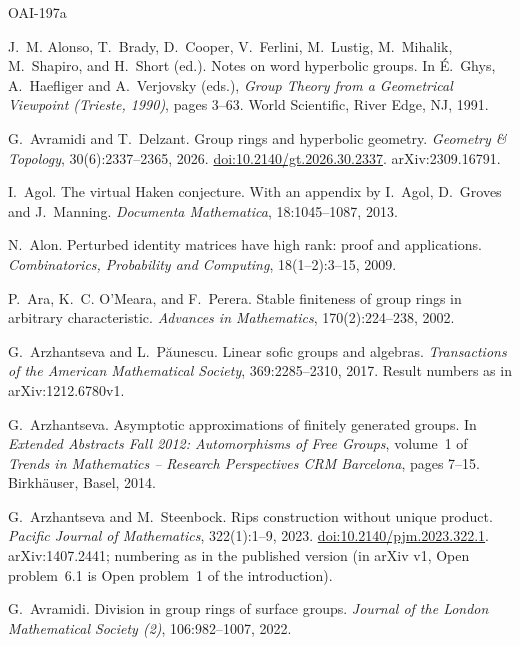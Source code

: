 \documentclass[11pt]{article}
\theoremstyle{definition}
\theoremstyle{plain}
\newcommand{\doi}[1]{\href{https://doi.org/#1}{doi:#1}}
\begin{document}
\begin{thebibliography}{OAI-197a}\footnotesize\setlength{\itemsep}{1pt plus 1pt}

J.~M. Alonso, T.~Brady, D.~Cooper, V.~Ferlini, M.~Lustig, M.~Mihalik, M.~Shapiro, and H.~Short (ed.).
\newblock Notes on word hyperbolic groups.
\newblock In \'E.~Ghys, A.~Haefliger and A.~Verjovsky (eds.), \emph{Group Theory from a Geometrical Viewpoint (Trieste, 1990)}, pages 3--63. World Scientific, River Edge, NJ, 1991.

G.~Avramidi and T.~Delzant.
\newblock Group rings and hyperbolic geometry.
\newblock \emph{Geometry \& Topology}, 30(6):2337--2365, 2026. \doi{10.2140/gt.2026.30.2337}. arXiv:2309.16791.

I.~Agol.
\newblock The virtual Haken conjecture. With an appendix by I.~Agol, D.~Groves and J.~Manning.
\newblock \emph{Documenta Mathematica}, 18:1045--1087, 2013.

N.~Alon.
\newblock Perturbed identity matrices have high rank: proof and applications.
\newblock \emph{Combinatorics, Probability and Computing}, 18(1--2):3--15, 2009.

P.~Ara, K.~C. O'Meara, and F.~Perera.
\newblock Stable finiteness of group rings in arbitrary characteristic.
\newblock \emph{Advances in Mathematics}, 170(2):224--238, 2002.

G.~Arzhantseva and L.~P\u{a}unescu.
\newblock Linear sofic groups and algebras.
\newblock \emph{Transactions of the American Mathematical Society}, 369:2285--2310, 2017. Result numbers as in arXiv:1212.6780v1.

G.~Arzhantseva.
\newblock Asymptotic approximations of finitely generated groups.
\newblock In \emph{Extended Abstracts Fall 2012: Automorphisms of Free Groups}, volume~1 of \emph{Trends in Mathematics -- Research Perspectives CRM Barcelona}, pages 7--15. Birkh\"auser, Basel, 2014.

G.~Arzhantseva and M.~Steenbock.
\newblock Rips construction without unique product.
\newblock \emph{Pacific Journal of Mathematics}, 322(1):1--9, 2023. \doi{10.2140/pjm.2023.322.1}. arXiv:1407.2441; numbering as in the published version (in arXiv v1, Open problem~6.1 is Open problem~1 of the introduction).

G.~Avramidi.
\newblock Division in group rings of surface groups.
\newblock \emph{Journal of the London Mathematical Society (2)}, 106:982--1007, 2022.


\end{thebibliography}
\end{document}
